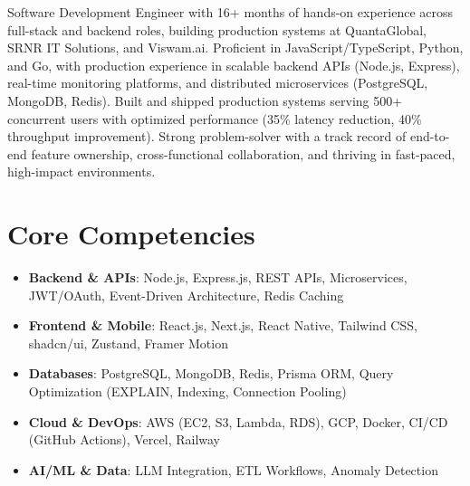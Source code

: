 \documentclass[11pt,a4paper,sans]{moderncv}
\begin{document}
\makecvtitle


\vspace{6pt}
\small{Software Development Engineer with 16+ months of hands-on experience across full-stack and backend roles, building production systems at QuantaGlobal, SRNR IT Solutions, and Viswam.ai. Proficient in JavaScript/TypeScript, Python, and Go, with production experience in scalable backend APIs (Node.js, Express), real-time monitoring platforms, and distributed microservices (PostgreSQL, MongoDB, Redis). Built and shipped production systems serving 500+ concurrent users with optimized performance (35\% latency reduction, 40\% throughput improvement). Strong problem-solver with a track record of end-to-end feature ownership, cross-functional collaboration, and thriving in fast-paced, high-impact environments.}


\section{Core Competencies}
\vspace{1pt}
\begin{itemize}

\item \textbf{Backend \& APIs}: Node.js, Express.js, REST APIs, Microservices, JWT/OAuth, Event-Driven Architecture, Redis Caching

\item \textbf{Frontend \& Mobile}: React.js, Next.js, React Native, Tailwind CSS, shadcn/ui, Zustand, Framer Motion

\item \textbf{Databases}: PostgreSQL, MongoDB, Redis, Prisma ORM, Query Optimization (EXPLAIN, Indexing, Connection Pooling)

\item \textbf{Cloud \& DevOps}: AWS (EC2, S3, Lambda, RDS), GCP, Docker, CI/CD (GitHub Actions), Vercel, Railway

\item \textbf{AI/ML \& Data}: LLM Integration, ETL Workflows, Anomaly Detection

\end{itemize}
\end{document}
